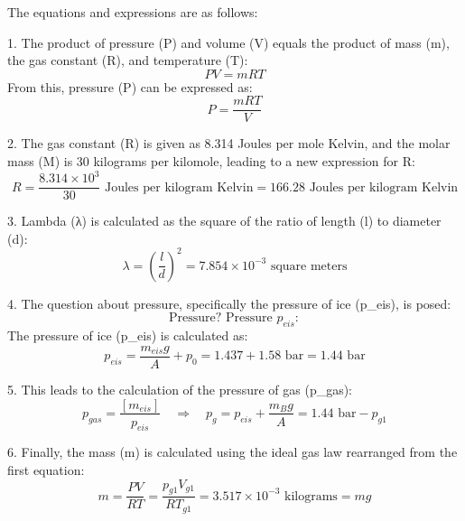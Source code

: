 The equations and expressions are as follows:

1. The product of pressure (P) and volume (V) equals the product of mass (m), the gas constant (R), and temperature (T):
   \[
   PV = mRT
   \]
   From this, pressure (P) can be expressed as:
   \[
   P = \frac{mRT}{V}
   \]

2. The gas constant (R) is given as 8.314 Joules per mole Kelvin, and the molar mass (M) is 30 kilograms per kilomole, leading to a new expression for R:
   \[
   R = \frac{8.314 \times 10^3}{30} \text{ Joules per kilogram Kelvin} = 166.28 \text{ Joules per kilogram Kelvin}
   \]

3. Lambda (λ) is calculated as the square of the ratio of length (l) to diameter (d):
   \[
   \lambda = \left( \frac{l}{d} \right)^2 = 7.854 \times 10^{-3} \text{ square meters}
   \]

4. The question about pressure, specifically the pressure of ice (p_eis), is posed:
   \[
   \text{Pressure? Pressure } p_{eis}:
   \]
   The pressure of ice (p_eis) is calculated as:
   \[
   p_{eis} = \frac{m_{eis} g}{A} + p_0 = 1.437 + 1.58 \text{ bar} = 1.44 \text{ bar}
   \]

5. This leads to the calculation of the pressure of gas (p_gas):
   \[
   p_{gas} = \frac{[m_{eis}]}{p_{eis}} \quad \Rightarrow \quad p_g = p_{eis} + \frac{m_B g}{A} = 1.44 \text{ bar} - p_{g1}
   \]

6. Finally, the mass (m) is calculated using the ideal gas law rearranged from the first equation:
   \[
   m = \frac{PV}{RT} = \frac{p_{g1} V_{g1}}{R T_{g1}} = 3.517 \times 10^{-3} \text{ kilograms} = mg
   \]
